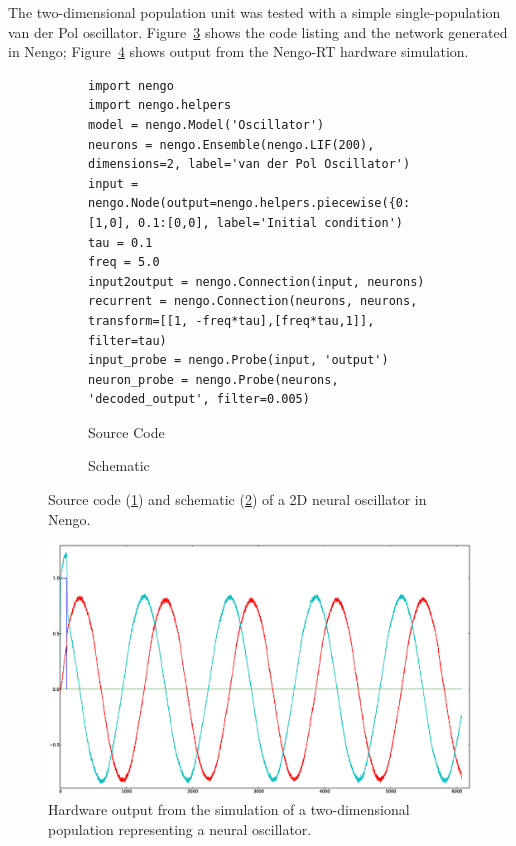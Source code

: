 \documentclass[english]{article}
\newcommand{\design}{Nengo-RT}
\begin{document}
The two-dimensional population unit was tested with a simple single-population van der Pol oscillator.
Figure~\ref{lst:oscillator2d} shows the code listing and the network generated in Nengo;
Figure~\ref{fig:oscillator2d} shows output from the \design{} hardware simulation.
\begin{figure}
\centering

\begin{subfigure}[b]{\textwidth}
\centering
\lstset{language=Python}
\begin{lstlisting}[frame=single]
import nengo
import nengo.helpers
model = nengo.Model('Oscillator')
neurons = nengo.Ensemble(nengo.LIF(200), dimensions=2, label='van der Pol Oscillator')
input = nengo.Node(output=nengo.helpers.piecewise({0:[1,0], 0.1:[0,0], label='Initial condition')
tau = 0.1
freq = 5.0
input2output = nengo.Connection(input, neurons)
recurrent = nengo.Connection(neurons, neurons, transform=[[1, -freq*tau],[freq*tau,1]], filter=tau)
input_probe = nengo.Probe(input, 'output')
neuron_probe = nengo.Probe(neurons, 'decoded_output', filter=0.005)
\end{lstlisting}
\caption{Source Code}
\label{lst:oscillator2d:code}
\end{subfigure}

\begin{subfigure}[b]{0.3\textwidth}
\centering
\caption{Schematic}
\label{lst:oscillator2d:schematic}
\end{subfigure}

\caption[A 2D neural oscillator in Nengo.]
{Source code (\ref{lst:oscillator2d:code}) and schematic (\ref{lst:oscillator2d:schematic})
of a 2D neural oscillator in Nengo.}
\label{lst:oscillator2d}
\end{figure}

\begin{figure}
\centering
\includegraphics[width=6in]{oscillator-2d.eps}

\caption[Simulation of a 2D neural oscillator.]
{Hardware output from the simulation of a two-dimensional population representing a neural oscillator.}
\label{fig:oscillator2d}
\end{figure}
\end{document}

